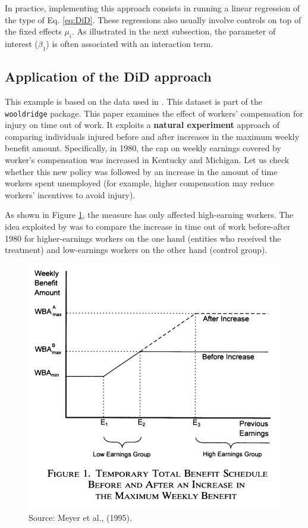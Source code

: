 \documentclass[
  12pt,
]{book}
\theoremstyle{definition}
\theoremstyle{definition}
\theoremstyle{definition}
\theoremstyle{definition}
\theoremstyle{remark}
\begin{document}
In practice, implementing this approach consists in running a linear regression of the type of Eq. \eqref{eq:DiD}. These regressions also usually involve controls on top of the fixed effects \(\mu_i\). As illustrated in the next subsection, the parameter of interest (\(\beta_1\)) is often associated with an interaction term.

\hypertarget{application-of-the-did-approach}{%
\subsection{Application of the DiD approach}\label{application-of-the-did-approach}}

This example is based on the data used in \citet{Meyer_Viscusi_Durbin_1995}. This dataset is part of the \texttt{wooldridge} package. This paper examines the effect of workers' compensation for injury on time out of work. It exploits a \textbf{natural experiment} approach of comparing individuals injured before and after increases in the maximum weekly benefit amount. Specifically, in 1980, the cap on weekly earnings covered by worker's compensation was increased in Kentucky and Michigan. Let us check whether this new policy was followed by an increase in the amount of time workers spent unemployed (for example, higher compensation may reduce workers' incentives to avoid injury).

As shown in Figure \ref{fig:figMeyer}, the measure has only affected high-earning workers. The idea exploited by \citet{Meyer_Viscusi_Durbin_1995} was to compare the increase in time out of work before-after 1980 for higher-earnings workers on the one hand (entities who received the treatment) and low-earnings workers on the other hand (control group).

\begin{figure}

{\centering \includegraphics[width=0.9\linewidth]{images/Figure_Meyer_et_al} 

}

\caption{Source: Meyer et al., (1995).}\label{fig:figMeyer}
\end{figure}
\end{document}
